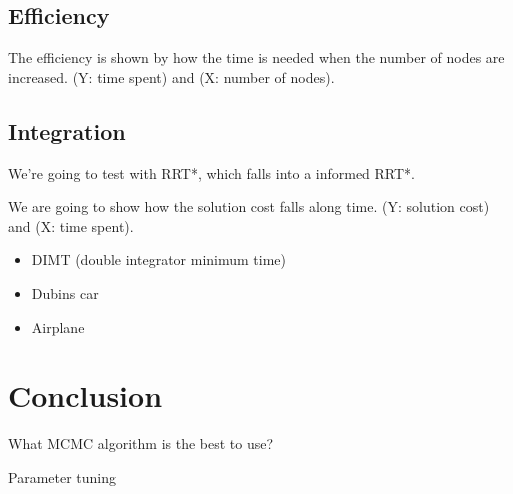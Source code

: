 \documentclass[letterpaper, 10 pt, conference]{ieeeconf}  %
\begin{document}
\subsection{Efficiency}

The efficiency is shown by how the time is needed when the number of nodes are increased.
(Y: time spent) and (X: number of nodes).

\subsection{Integration}

We're going to test with RRT*, which falls into a informed RRT*.

We are going to show how the solution cost falls along time.
(Y: solution cost) and (X: time spent).

\begin{itemize}
\item DIMT (double integrator minimum time)
\item Dubins car
\item Airplane
\end{itemize}

\section{Conclusion}

What MCMC algorithm is the best to use?

Parameter tuning
\end{document}
